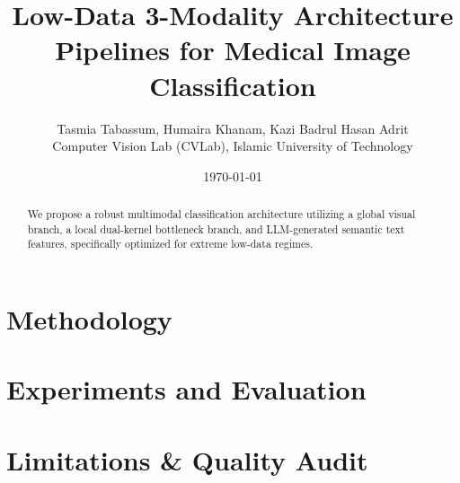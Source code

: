 \documentclass{article}
\title{Low-Data 3-Modality Architecture Pipelines for Medical Image Classification}
\author{Tasmia Tabassum, Humaira Khanam, Kazi Badrul Hasan Adrit \\ Computer Vision Lab (CVLab), Islamic University of Technology}
\date{\today}
\begin{document}
\maketitle

\begin{abstract}
We propose a robust multimodal classification architecture utilizing a global visual branch, a local dual-kernel bottleneck branch, and LLM-generated semantic text features, specifically optimized for extreme low-data regimes.
\end{abstract}

\section{Methodology}

\section{Experiments and Evaluation}

\section{Limitations \& Quality Audit}
\end{document}
